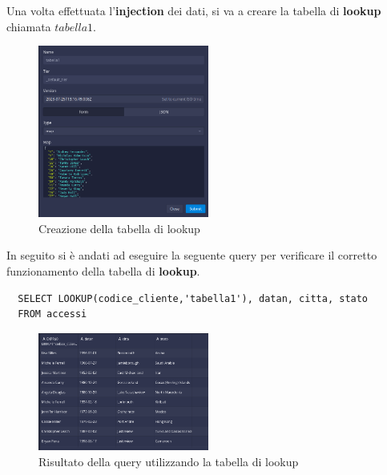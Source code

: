 \documentclass{article}
\begin{document}
Una volta effettuata l'\textbf{injection} dei dati, si va a creare la tabella di \textbf{lookup} chiamata $tabella1$.
\begin{figure}[H]
    \centering
    \includegraphics[width=0.5\textwidth]{images/inserimento_lookup.png}
    \caption{Creazione della tabella di lookup}
\end{figure}
In seguito si è andati ad eseguire la seguente query per verificare il corretto funzionamento della tabella di \textbf{lookup}.
\begin{lstlisting}
  SELECT LOOKUP(codice_cliente,'tabella1'), datan, citta, stato
  FROM accessi
\end{lstlisting}
\begin{figure}[H]
    \centering
    \includegraphics[width=0.5\textwidth]{images/lookup.png}
    \caption{Risultato della query utilizzando la tabella di lookup}
\end{figure}






\end{document}
